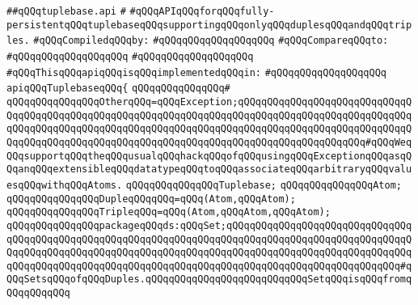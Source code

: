 \label{src/lib/src/tuplebase.api}
\verb|##qQQqtuplebase.api|\newline
\verb|#|\newline
\verb|#qQQqAPIqQQqforqQQqfully-persistentqQQqtuplebaseqQQqsupportingqQQqonlyqQQqduplesqQQqandqQQqtriples.|\newline
\newline
\verb|#qQQqCompiledqQQqby:|\newline
\verb|#qQQqqQQqqQQqqQQqqQQq|\newline
\newline
\verb|#qQQqCompareqQQqto:|\newline
\verb|#qQQqqQQqqQQqqQQqqQQq|\newline
\verb|#qQQqqQQqqQQqqQQqqQQq|\newline
\newline
\verb|#qQQqThisqQQqapiqQQqisqQQqimplementedqQQqin:|\newline
\verb|#qQQqqQQqqQQqqQQqqQQq|\newline
\newline
\verb|apiqQQqTuplebaseqQQq{|\newline
\verb|qQQqqQQqqQQqqQQq#|\newline
\verb|qQQqqQQqqQQqqQQqOtherqQQq=qQQqException;qQQqqQQqqQQqqQQqqQQqqQQqqQQqqQQqqQQqqQQqqQQqqQQqqQQqqQQqqQQqqQQqqQQqqQQqqQQqqQQqqQQqqQQqqQQqqQQqqQQqqQQqqQQqqQQqqQQqqQQqqQQqqQQqqQQqqQQqqQQqqQQqqQQqqQQqqQQqqQQqqQQqqQQqqQQqqQQqqQQqqQQqqQQqqQQqqQQqqQQqqQQqqQQqqQQqqQQqqQQqqQQqqQQqqQQq#qQQqWeqQQqsupportqQQqtheqQQqusualqQQqhackqQQqofqQQqusingqQQqExceptionqQQqasqQQqanqQQqextensibleqQQqdatatypeqQQqtoqQQqassociateqQQqarbitraryqQQqvaluesqQQqwithqQQqAtoms.|\newline
\newline
\verb|qQQqqQQqqQQqqQQqTuplebase;|\newline
\verb|qQQqqQQqqQQqqQQqAtom;|\newline
\newline
\verb|qQQqqQQqqQQqqQQqDupleqQQqqQQq=qQQq(Atom,qQQqAtom);|\newline
\verb|qQQqqQQqqQQqqQQqTripleqQQq=qQQq(Atom,qQQqAtom,qQQqAtom);|\newline
\newline
\verb|qQQqqQQqqQQqqQQqpackageqQQqds:qQQqSet;qQQqqQQqqQQqqQQqqQQqqQQqqQQqqQQqqQQqqQQqqQQqqQQqqQQqqQQqqQQqqQQqqQQqqQQqqQQqqQQqqQQqqQQqqQQqqQQqqQQqqQQqqQQqqQQqqQQqqQQqqQQqqQQqqQQqqQQqqQQqqQQqqQQqqQQqqQQqqQQqqQQqqQQqqQQqqQQqqQQqqQQqqQQqqQQqqQQqqQQqqQQqqQQqqQQqqQQqqQQqqQQqqQQqqQQqqQQqqQQq#qQQqSetsqQQqofqQQqDuples.qQQqqQQqqQQqqQQqqQQqqQQqqQQqSetqQQqisqQQqfromqQQqqQQqqQQq|\newline
